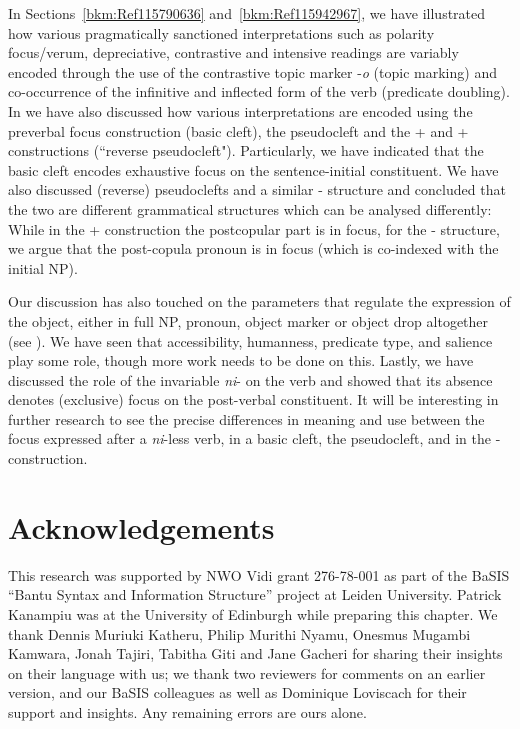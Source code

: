 \documentclass[output=paper]{langscibook}
\begin{document}
In Sections~\ref{bkm:Ref115790636} and~\ref{bkm:Ref115942967}, we have illustrated how various pragmatically sanctioned interpretations such as polarity focus/verum, depreciative, contrastive and intensive readings are variably encoded through the use of the contrastive topic marker \mbox{-\textit{o}} (topic marking) and co-occurrence of the infinitive and inflected form of the verb (predicate doubling). In  we have also discussed how various interpretations are encoded using the preverbal focus construction (basic cleft), the pseudocleft and the \NI+\RM{} and \NI+\PRO{} constructions (``reverse pseudocleft"). Particularly, we have indicated that the basic cleft encodes exhaustive focus on the sentence-initial constituent. We have also discussed (reverse) pseudoclefts and a similar \NI-\PRO{} structure and concluded that the two are different grammatical structures which can be analysed differently: While in the \NI+\RM{} construction the postcopular part is in focus, for the \NI-\PRO{} structure, we argue that the post-copula pronoun is in focus (which is co-indexed with the initial NP).

Our discussion has also touched on the parameters that regulate the expression of the object, either in full NP, pronoun, object marker or object drop altogether (see ). We have seen that accessibility, humanness, predicate type, and salience play some role, though more work needs to be done on this. Lastly, we have discussed the role of the invariable \textit{ni}- on the verb and showed that its absence denotes (exclusive) focus on the post-verbal constituent. It will be interesting in further research to see the precise differences in meaning and use between the focus expressed after a \textit{ni}-less verb, in a basic cleft, the pseudocleft, and in the \NI-\PRO{} construction.

\section*{Acknowledgements}

This research was supported by NWO Vidi grant 276-78-001 as part of the BaSIS “Bantu Syntax and Information Structure” project at Leiden University. Patrick Kanampiu was at the University of Edinburgh while preparing this chapter. We thank Dennis Muriuki Katheru, Philip Murithi Nyamu, Onesmus Mugambi Kamwara, Jonah Tajiri, Tabitha Giti and Jane Gacheri for sharing their insights on their language with us; we thank two reviewers for comments on an earlier version, and our BaSIS colleagues as well as Dominique Loviscach for their support and insights. Any remaining errors are ours alone.
\end{document}
